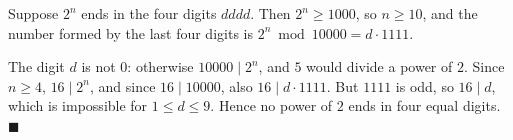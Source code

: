 Suppose $2^n$ ends in the four digits $dddd$. Then $2^n\ge1000$, so $n\ge10$, and the number formed by the last four digits is $2^n\bmod 10000=d\cdot1111$.

The digit $d$ is not $0$: otherwise $10000\mid2^n$, and $5$ would divide a power of $2$. Since $n\ge4$, $16\mid2^n$, and since $16\mid10000$, also $16\mid d\cdot1111$. But $1111$ is odd, so $16\mid d$, which is impossible for $1\le d\le9$. Hence no power of $2$ ends in four equal digits. $\blacksquare$
